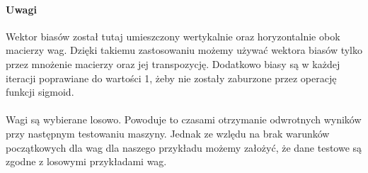     \paragraph{Uwagi}
	 Wektor biasów został tutaj umieszczony wertykalnie oraz horyzontalnie obok macierzy wag.
	 Dzięki takiemu zastosowaniu możemy używać wektora biasów tylko przez mnożenie macierzy oraz jej transpozycję.
	 Dodatkowo biasy są w każdej iteracji poprawiane do wartości 1, żeby nie zostały zaburzone przez operację funkcji sigmoid.
    \paragraph{}
	 Wagi są wybierane losowo. Powoduje to czasami otrzymanie odwrotnych wyników przy następnym testowaniu maszyny.
	 Jednak ze wzlędu na brak warunków początkowych dla wag dla naszego przykładu możemy założyć, że dane testowe są zgodne z losowymi przykładami wag.
